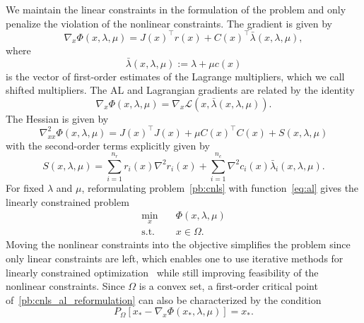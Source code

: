 \documentclass[pdflatex,sn-mathphys-num]{sn-jnl}%
\theoremstyle{thmstyleone}%
\newcommand{\calL}{{\mathcal{L}}}
\newcommand{\proj}[2]{P_{#1} \left[ {#2} \right]} %
\begin{document}
We maintain the linear constraints in the formulation of the problem and only penalize the violation of the nonlinear constraints.
The gradient is given by 
\begin{equation*}
	\nabla_x \Phi(x,\lambda,\mu) = J(x)^\top r(x) + C(x)^\top\bar{\lambda}(x,\lambda,\mu),
\end{equation*}
where
\begin{equation}\label{eq:1st_order_mult}
	\bar{\lambda}(x,\lambda,\mu):=\lambda + \mu c(x)
\end{equation} 
is the vector of first-order estimates of the Lagrange multipliers, which we call shifted multipliers. The AL and Lagrangian gradients are related by the identity
\begin{equation}\label{eq:identity_al_lag_grad}
	\nabla_x \Phi(x,\lambda,\mu) = \nabla_x \calL(x,\bar{\lambda}(x,\lambda,\mu)).
\end{equation}
The Hessian is given by
\begin{equation*}
	\nabla^2_{xx} \Phi(x,\lambda,\mu) = J(x)^\top J(x) + \mu C(x)^\top C(x) +  S(x,\lambda,\mu) 
\end{equation*}
with the second-order terms explicitly given by
\begin{equation}\label{eq:al_hessian_2nd_terms}
	S(x,\lambda,\mu) =\sum_{i=1}^{n_r} r_i(x) \nabla^2r_i(x) + \sum_{i=1}^{n_c} \nabla^2 c_i(x) \bar{\lambda}_i(x,\lambda,\mu).
\end{equation}
For fixed $\lambda$ and $\mu$, reformulating problem~\eqref{pb:cnls} with function~\eqref{eq:al} gives the linearly constrained problem
\begin{equation}\label{pb:cnls_al_reformulation} 
	\begin{aligned}
		\min_{x} \quad& \Phi(x,\lambda,\mu)  \\
		\text{s.t.}  \quad & x \in \Omega.
	\end{aligned}	
\end{equation}
Moving the nonlinear constraints into the objective simplifies the problem since only linear constraints are left, which enables one to use iterative methods for linearly constrained optimization~\cite{gould-etal:2001,conn-etal:1988b} while still improving feasibility of the nonlinear constraints. Since $\Omega$ is a convex set, a first-order critical point of~\eqref{pb:cnls_al_reformulation} can also be characterized by the condition
\begin{equation*}
	\proj{\Omega}{x_*-\nabla_x \Phi(x_*,\lambda,\mu)} = x_*.
\end{equation*}
\end{document}
